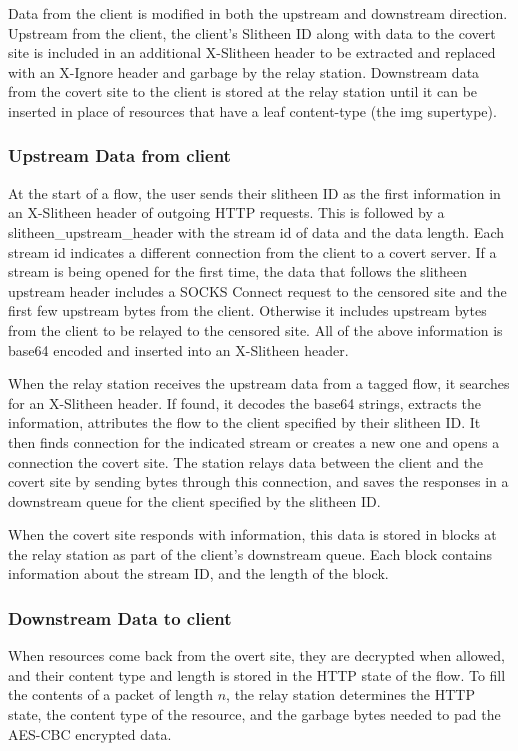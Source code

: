 \documentclass[11pt]{article}
\theoremstyle{definittion}
\begin{document}
Data from the client is modified in both the upstream and downstream direction. Upstream from the client, the client's Slitheen ID along with data to the covert site is included in an additional X-Slitheen header to be extracted and replaced with an X-Ignore header and garbage by the relay station.
Downstream data from the covert site to the client is stored at the relay station until it can be inserted in place of resources that have a leaf content-type (the img supertype).

\subsubsection{Upstream Data from client}

At the start of a flow, the user sends their slitheen ID as the first information in an X-Slitheen header of outgoing HTTP requests. This is followed by a slitheen\_upstream\_header with the stream id of data and the data length. Each stream id indicates a different connection from the client to a covert server.
If a stream is being opened for the first time, the data that follows the slitheen upstream header includes a SOCKS Connect request to the censored site and the first few upstream bytes from the client. Otherwise it includes upstream bytes from the client to be relayed to the censored site. All of the above information is base64 encoded and inserted into an X-Slitheen header.

When the relay station receives the upstream data from a tagged flow, it searches for an X-Slitheen header. If found, it decodes the base64 strings, extracts the information, attributes the flow to the client specified by their slitheen ID.
It then finds connection for the indicated stream or creates a new one and opens a connection the covert site. The station relays data between the client and the covert site by sending bytes through this connection, and saves the responses in a downstream queue for the client specified by the slitheen ID.

When the covert site responds with information, this data is stored in blocks at the relay station as part of the client's downstream queue. Each block contains information about the stream ID, and the length of the block.

\subsubsection{Downstream Data to client}

When resources come back from the overt site, they are decrypted when allowed, and their content type and length is stored in the HTTP state of the flow. To fill the contents of a packet of length $n$, the relay station determines the HTTP state, the content type of the resource, and the garbage bytes needed to pad the AES-CBC encrypted data.
\end{document}
